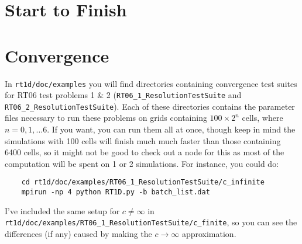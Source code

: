 \documentclass[letterpaper,titlepage,12pt]{article}
\numberwithin{equation}{section}
\begin{document}
\section{Start to Finish}

\section{Convergence}
In \texttt{rt1d/doc/examples} you will find directories containing convergence test suites for RT06 test problems 1 \& 2 (\texttt{RT06\_1\_ResolutionTestSuite} and \texttt{RT06\_2\_ResolutionTestSuite}).  Each of these directories contains the parameter files necessary to run these problems on grids containing $100 \times 2^n$ cells, where $n = 0,1,...6$.  If you want, you can run them all at once, though keep in mind the simulations with 100 cells will finish much much faster than those containing 6400 cells, so it might not be good to check out a node for this as most of the computation will be spent on 1 or 2 simulations.  For instance, you could do:
\begin{verbatim}
    cd rt1d/doc/examples/RT06_1_ResolutionTestSuite/c_infinite
    mpirun -np 4 python RT1D.py -b batch_list.dat
\end{verbatim}
I've included the same setup for $c \neq \infty$ in \texttt{rt1d/doc/examples/RT06\_1\_ResolutionTestSuite/c\_finite}, so you can see the differences (if any) caused by making the $c \rightarrow \infty$ approximation.


\newpage


\end{document}
